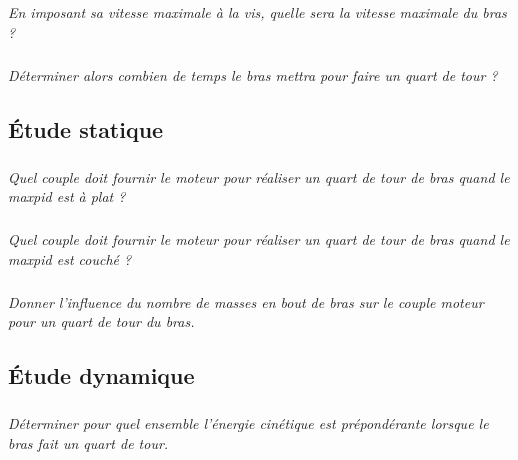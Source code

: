 \documentclass[10pt,fleqn]{article} %
\begin{document}
\begin{multicols}{2}
\subparagraph{}\textit{En imposant sa vitesse maximale à la vis, quelle sera la vitesse maximale du bras ?}

\subparagraph{}\textit{Déterminer alors combien de temps le bras mettra pour faire un quart de tour ?}


\subsection*{Étude statique}

\subparagraph{}\textit{Quel couple doit fournir le moteur pour réaliser un quart de tour de bras quand le maxpid est à plat ?}
\subparagraph{}\textit{Quel couple doit fournir le moteur pour réaliser un quart de tour de bras quand le maxpid est couché ?}

\subparagraph{}\textit{Donner l'influence du nombre de masses en bout de bras sur le couple moteur pour un quart de tour du bras.}


\subsection*{Étude dynamique}

\subparagraph{}\textit{Déterminer pour quel ensemble l'énergie cinétique est prépondérante lorsque le bras fait un quart de tour.}

\end{multicols}
\end{document}
